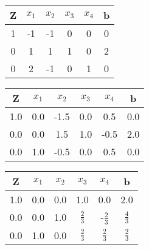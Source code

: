\begin{center}
	\begin{tabular}{|c|c|c|c|c|c|}
		\hline
		Z & $x_1$ & $x_2$ & $x_3$ & $x_4$ & b\\
		\hline
		1 & -1 & -1 & 0 & 0 & 0\\
		0 & 1 & 1 & 1 & 0 & 2\\
		0 & 2 & -1 & 0 & 1 & 0\\
		\hline
	\end{tabular}
\end{center}
\begin{center}
	\begin{tabular}{|c|c|c|c|c|c|}
		\hline
		Z & $x_1$ & $x_2$ & $x_3$ & $x_4$ & b\\
		\hline
		1.0 & 0.0 & -1.5 & 0.0 & 0.5 & 0.0\\
		0.0 & 0.0 & 1.5 & 1.0 & -0.5 & 2.0\\
		0.0 & 1.0 & -0.5 & 0.0 & 0.5 & 0.0\\
		\hline
	\end{tabular}
\end{center}
\begin{center}
	\begin{tabular}{|c|c|c|c|c|c|}
		\hline
		Z & $x_1$ & $x_2$ & $x_3$ & $x_4$ & b\\
		\hline
		1.0 & 0.0 & 0.0 & 1.0 & 0.0 & 2.0\\
		0.0 & 0.0 & 1.0 & $\frac 2 3$ & -$\frac 2 3$ & $\frac 4 3$\\
		0.0 & 1.0 & 0.0 & $\frac 2 3$ & $\frac 2 3$ & $\frac 2 3$\\
		\hline
	\end{tabular}
\end{center}
